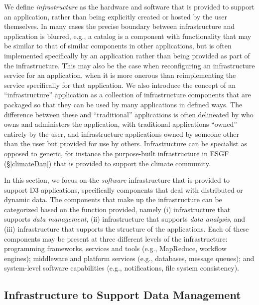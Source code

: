 
We define {\em infrastructure} as the hardware and software that is
provided to support an application, rather than being explicitly
created or hosted by the user themselves. In many cases the precise boundary between
infrastructure and application is blurred, e.g., a catalog is
a component with functionality that may be similar to that of similar
components in other applications, but is often implemented
specifically by an application rather than being provided as part of
the infrastructure. This may also be the case when reconfiguring an
infrastructure service for an application, when it is more onerous than
reimplementing the service specifically for that
application. We also introduce the concept of an ``infrastructure'' application as a collection
of infrastructure components that are packaged so that they can be used by many
applications in defined ways. The difference between these and ``traditional'' applications
is often delineated by who owns and administers the application, with traditional applications
``owned'' entirely by the user, and infrastructure applications owned by someone other than the
user but provided for use by others. Infrastructure can be specialist as opposed to generic, for instance
the purpose-built infrastructure in ESGF (\S\ref{climateDan}) that is provided to support the climate community.

In this section, we focus on the {\em software} infrastructure that is
provided to support D3 applications, specifically components that deal
with distributed or dynamic data. The components that make up the infrastructure can be categorized
based on the function provided, namely (i) infrastructure that supports {\it data management},
(ii) infrastructure that supports {\it data analysis}, and (iii) infrastructure that supports the structure of the applications.
Each of these components may be present at three different levels of the infrastructure: programming frameworks, services and tools (e.g., MapReduce, workflow engines); middleware and platform services (e.g., databases, message queues); and system-level
software capabilities (e.g., notifications, file system consistency).


\subsection{Infrastructure to Support Data Management}
\label{sec:infra_mgt}

